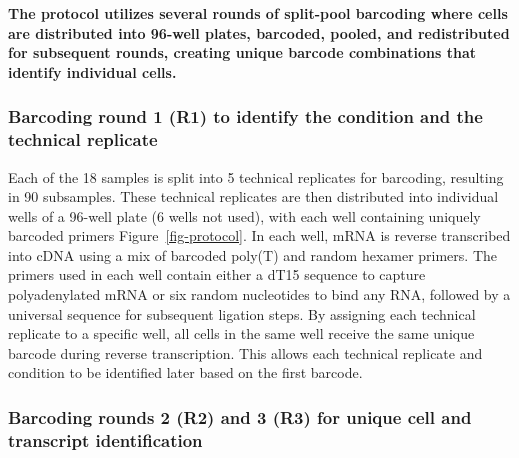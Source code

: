 \documentclass[
  11pt,
  a4paper,
]{report}
\begin{document}
\begin{tcolorbox}[enhanced jigsaw, arc=.35mm, colbacktitle=quarto-callout-tip-color!10!white, rightrule=.15mm, title=\textcolor{quarto-callout-tip-color}{\faLightbulb}\hspace{0.5em}{Tip}, coltitle=black, bottomrule=.15mm, left=2mm, opacityback=0, colback=white, toprule=.15mm, toptitle=1mm, titlerule=0mm, breakable, bottomtitle=1mm, opacitybacktitle=0.6, colframe=quarto-callout-tip-color-frame, leftrule=.75mm]

\textbf{The protocol utilizes several rounds of split-pool barcoding
where cells are distributed into 96-well plates, barcoded, pooled, and
redistributed for subsequent rounds, creating unique barcode
combinations that identify individual cells.}

\end{tcolorbox}

\subsubsection{Barcoding round 1 (R1) to identify the condition and the
technical
replicate}\label{barcoding-round-1-r1-to-identify-the-condition-and-the-technical-replicate}

Each of the 18 samples is split into 5 technical replicates for
barcoding, resulting in 90 subsamples. These technical replicates are
then distributed into individual wells of a 96-well plate (6 wells not
used), with each well containing uniquely barcoded primers
Figure~\ref{fig-protocol}. In each well, mRNA is reverse transcribed
into cDNA using a mix of barcoded poly(T) and random hexamer primers.
The primers used in each well contain either a dT15 sequence to capture
polyadenylated mRNA or six random nucleotides to bind any RNA, followed
by a universal sequence for subsequent ligation steps. By assigning each
technical replicate to a specific well, all cells in the same well
receive the same unique barcode during reverse transcription. This
allows each technical replicate and condition to be identified later
based on the first barcode.

\subsubsection{Barcoding rounds 2 (R2) and 3 (R3) for unique cell and
transcript
identification}\label{barcoding-rounds-2-r2-and-3-r3-for-unique-cell-and-transcript-identification}
\end{document}
